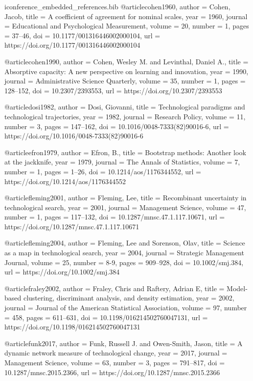 \begin{filecontents*}[overwrite]{iconference_embedded_references.bib}
@article{cohen1960,
  author = {Cohen, Jacob},
  title = {A coefficient of agreement for nominal scales},
  year = {1960},
  journal = {Educational and Psychological Measurement},
  volume = {20},
  number = {1},
  pages = {37--46},
  doi = {10.1177/001316446002000104},
  url = {https://doi.org/10.1177/001316446002000104}
}

@article{cohen1990,
  author = {Cohen, Wesley M. and Levinthal, Daniel A.},
  title = {Absorptive capacity: A new perspective on learning and innovation},
  year = {1990},
  journal = {Administrative Science Quarterly},
  volume = {35},
  number = {1},
  pages = {128--152},
  doi = {10.2307/2393553},
  url = {https://doi.org/10.2307/2393553}
}

@article{dosi1982,
  author = {Dosi, Giovanni},
  title = {Technological paradigms and technological trajectories},
  year = {1982},
  journal = {Research Policy},
  volume = {11},
  number = {3},
  pages = {147--162},
  doi = {10.1016/0048-7333(82)90016-6},
  url = {https://doi.org/10.1016/0048-7333(82)90016-6}
}

@article{efron1979,
  author = {Efron, B.},
  title = {Bootstrap methods: Another look at the jackknife},
  year = {1979},
  journal = {The Annals of Statistics},
  volume = {7},
  number = {1},
  pages = {1--26},
  doi = {10.1214/aos/1176344552},
  url = {https://doi.org/10.1214/aos/1176344552}
}

@article{fleming2001,
  author = {Fleming, Lee},
  title = {Recombinant uncertainty in technological search},
  year = {2001},
  journal = {Management Science},
  volume = {47},
  number = {1},
  pages = {117--132},
  doi = {10.1287/mnsc.47.1.117.10671},
  url = {https://doi.org/10.1287/mnsc.47.1.117.10671}
}

@article{fleming2004,
  author = {Fleming, Lee and Sorenson, Olav},
  title = {Science as a map in technological search},
  year = {2004},
  journal = {Strategic Management Journal},
  volume = {25},
  number = {8-9},
  pages = {909--928},
  doi = {10.1002/smj.384},
  url = {https://doi.org/10.1002/smj.384}
}

@article{fraley2002,
  author = {Fraley, Chris and Raftery, Adrian E},
  title = {Model-based clustering, discriminant analysis, and density estimation},
  year = {2002},
  journal = {Journal of the American Statistical Association},
  volume = {97},
  number = {458},
  pages = {611--631},
  doi = {10.1198/016214502760047131},
  url = {https://doi.org/10.1198/016214502760047131}
}

@article{funk2017,
  author = {Funk, Russell J. and Owen-Smith, Jason},
  title = {A dynamic network measure of technological change},
  year = {2017},
  journal = {Management Science},
  volume = {63},
  number = {3},
  pages = {791--817},
  doi = {10.1287/mnsc.2015.2366},
  url = {https://doi.org/10.1287/mnsc.2015.2366}
}


\end{filecontents*}
